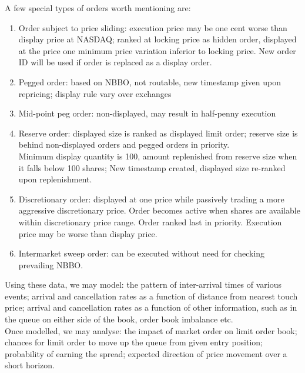 \documentclass[a4paper,oneside,openany]{book}
\begin{document}
\begin{definition}
\begin{enumerate}[label=\roman*.]
\begin{enumerate}[label=\arabic*.]
\end{enumerate}
A few special types of orders worth mentioning are:
\begin{enumerate}[label=\arabic*.]
\setlength{\itemsep}{0pt}
\item Order subject to price sliding: execution price may be one cent worse than display price at NASDAQ; ranked at locking price as hidden order, displayed at the price one minimum price variation inferior to locking price. New order ID will be used if order is replaced as a display order.
\item Pegged order: based on NBBO, not routable, new timestamp given upon repricing; display rule vary over exchanges
\item Mid-point peg order: non-displayed, may result in half-penny execution
\item Reserve order: displayed size is ranked as displayed limit order; reserve size is behind non-displayed orders and pegged orders in priority.\\
Minimum display quantity is 100, amount replenished from reserve size when it falls below 100 shares; New timestamp created, displayed size re-ranked upon replenishment.
\item Discretionary order: displayed at one price while passively trading a more aggressive discretionary price. Order becomes active when shares are available within discretionary price range. Order ranked last in priority. Execution price may be worse than display price.
\item Intermarket sweep order: can be executed without need for checking prevailing NBBO. 
\end{enumerate}
Using these data, we may model: the pattern of inter-arrival times of various events; arrival and cancellation rates as a function of distance from nearest touch price; arrival and cancellation rates as a function of other information, such as in the queue on either side of the book, order book imbalance etc.\\
Once modelled, we may analyse: the impact of market order on limit order book; chances for limit order to move up the queue from given entry position; probability of earning the spread; expected direction of price movement over a short horizon.
\end{enumerate}
\end{definition}
\end{document}
